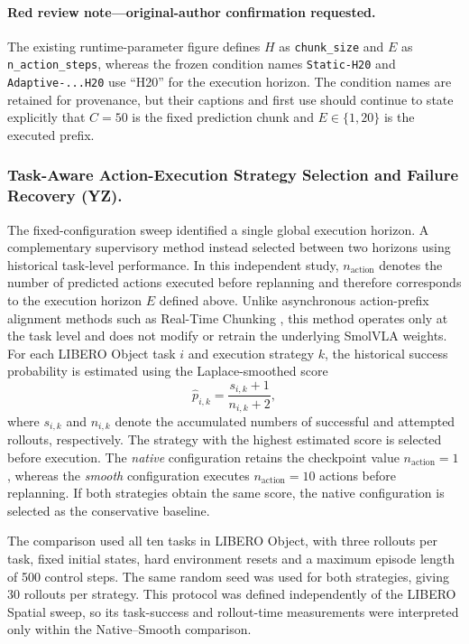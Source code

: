 \begin{codexadded}
\paragraph{Red review note---original-author confirmation requested.}
The existing runtime-parameter figure defines \(H\) as
\texttt{chunk\_size} and \(E\) as \texttt{n\_action\_steps}, whereas the
frozen condition names \texttt{Static-H20} and \texttt{Adaptive-...H20}
use ``H20'' for the execution horizon. The condition names are retained for
provenance, but their captions and first use should continue to state explicitly
that \(C=50\) is the fixed prediction chunk and \(E\in\{1,20\}\) is the
executed prefix.
\end{codexadded}

\subsubsection{Task-Aware Action-Execution Strategy Selection and Failure Recovery (YZ).}
\label{sec:task_aware_routing}
The fixed-configuration sweep identified a single global execution horizon. A
complementary supervisory method instead selected between two horizons using
historical task-level performance. In this independent study,
\(n_{\mathrm{action}}\) denotes the number of predicted actions executed before
replanning and therefore corresponds to the execution horizon \(E\) defined
above. Unlike asynchronous action-prefix alignment methods such as Real-Time
Chunking \cite{rtc}, this method operates only at the task level and does not
modify or retrain the underlying SmolVLA weights. For each LIBERO Object task
\(i\) and
execution strategy \(k\), the historical success probability is estimated
using the Laplace-smoothed score
%
\begin{equation}
    \hat{p}_{i,k}
    =
    \frac{s_{i,k}+1}{n_{i,k}+2},
    \label{eq:laplace_strategy_score}
\end{equation}
%
where \(s_{i,k}\) and \(n_{i,k}\) denote the accumulated numbers of
successful and attempted rollouts, respectively. The strategy with the
highest estimated score is selected before execution. The
\textit{native} configuration retains the checkpoint value
\(n_{\mathrm{action}}=1\), whereas the \textit{smooth} configuration
executes \(n_{\mathrm{action}}=10\) actions before replanning. If both
strategies obtain the same score, the native configuration is selected
as the conservative baseline.

The comparison used all ten tasks in LIBERO Object, with three rollouts per
task, fixed initial states, hard environment resets and a maximum episode
length of 500 control steps. The same random seed was used for both strategies,
giving 30 rollouts per strategy. This protocol was defined independently of the
LIBERO Spatial sweep, so its task-success and rollout-time measurements were
interpreted only within the Native--Smooth comparison.

